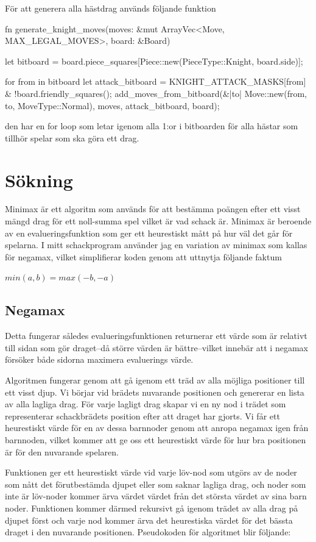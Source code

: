 \documentclass{article}
\begin{document}
      För att generera alla hästdrag används följande funktion

fn generate_knight_moves(moves: &mut ArrayVec<Move, MAX_LEGAL_MOVES>, board: &Board) {
    let bitboard = board.piece_squares[Piece::new(PieceType::Knight, board.side)];

    for from in bitboard {
        let attack_bitboard = KNIGHT_ATTACK_MASKS[from] & !board.friendly_squares();
        add_moves_from_bitboard(&|to| Move::new(from, to, MoveType::Normal), moves, attack_bitboard, board);
    }
  }

  den har en for loop som letar igenom alla 1:or i bitboarden för alla hästar som tillhör spelar som ska göra ett drag.





\section{Sökning}
Minimax är ett algoritm som används för att bestämma poängen efter ett visst mängd drag för ett noll-summa spel vilket är vad schack är. Minimax är beroende av en evalueringsfunktion som ger ett heurestiskt mått på hur väl det går för spelarna. I mitt schackprogram använder jag en variation av minimax som kallas för negamax, vilket simplifierar koden genom att uttnytja följande faktum

\begin{math}
min(a,b)=max(-b,-a)
\end{math}

\subsection{Negamax}
Detta fungerar således evalueringsfunktionen returnerar ett värde som är relativt till sidan som gör draget--då större värden är bättre--vilket innebär att i negamax försöker både sidorna maximera evaluerings värde. 

Algoritmen fungerar genom att gå igenom ett träd av alla möjliga positioner till ett visst djup. Vi börjar vid brädets nuvarande positionen och genererar en lista av alla lagliga drag. För varje lagligt drag skapar vi en ny nod i trädet som representerar schackbrädets position efter att draget har gjorts. Vi får ett heurestiskt värde för en av dessa barnnoder genom att anropa negamax igen från barnnoden, vilket kommer att ge oss ett heurestiskt värde för hur bra positionen är för den nuvarande spelaren. 

Funktionen ger ett heurestiskt värde vid varje löv-nod som utgörs av de noder som nått det förutbestämda djupet eller som saknar lagliga drag, och noder som inte är löv-noder kommer ärva värdet värdet från det största värdet av sina barn noder. Funktionen kommer därmed rekursivt gå igenom trädet av alla drag på djupet först och varje nod kommer ärva det heurestiska värdet för det bässta draget i den nuvarande positionen.
Pseudokoden för algoritmet blir följande:
\end{document}
